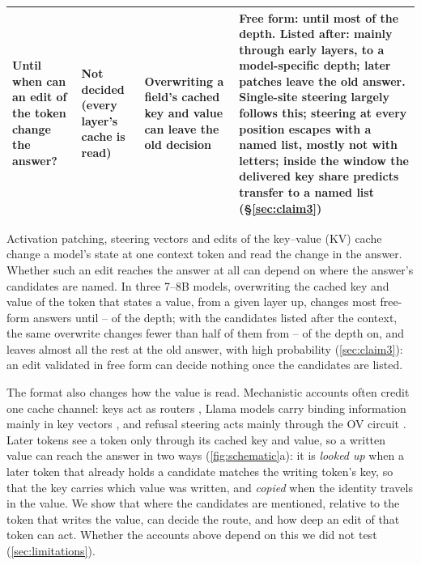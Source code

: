 \begin{table}[t]
\begin{tabular}{@{}p{}p{}p{}p{}@{}}
    \raggedright Until when can an edit of the token change the answer? & \raggedright Not decided (every layer's cache is read) & \raggedright Overwriting a field's cached key and value can leave the old decision \citep{bojieli2026notes} & Free form: until most of the depth. Listed after: mainly through early layers, to a model-specific depth; later patches leave the old answer. Single-site steering largely follows this; steering at every position escapes with a named list, mostly not with letters; inside the window the delivered key share predicts transfer to a named list (\S\ref{sec:claim3}) \\
    \bottomrule
  \end{tabular}
\end{table}

Activation patching, steering vectors and edits of the key--value (KV) cache change a model's state at one context token and read the change in the answer. Whether such an edit reaches the answer at all can depend on where the answer's candidates are named. In three 7--8B models, overwriting the cached key and value of the token that states a value, from a given layer up, changes most free-form answers until \pctn{\NqLcFracNoneMin}--\pct{\NqLcFracNoneMax} of the depth; with the candidates listed after the context, the same overwrite changes fewer than half of them from \pctn{\NqLcFracListedMin}--\pct{\NqLcFracListedMax} of the depth on, and leaves almost all the rest at the old answer, with high probability (\cref{sec:claim3}): an edit validated in free form can decide nothing once the candidates are listed.

The format also changes how the value is read. Mechanistic accounts often credit one cache channel: keys act as routers \citep{ma2025addressbook}, Llama models carry binding information mainly in key vectors \citep{oh2026rebinding}, and refusal steering acts mainly through the OV circuit \citep{cheng2026steering}. Later tokens see a token only through its cached key and value, so a written value can reach the answer in two ways (\cref{fig:schematic}a): it is \emph{looked up} when a later token that already holds a candidate matches the writing token's key, so that the key carries which value was written, and \emph{copied} when the identity travels in the value. We show that where the candidates are mentioned, relative to the token that writes the value, can decide the route, and how deep an edit of that token can act. Whether the accounts above depend on this we did not test (\cref{sec:limitations}).

